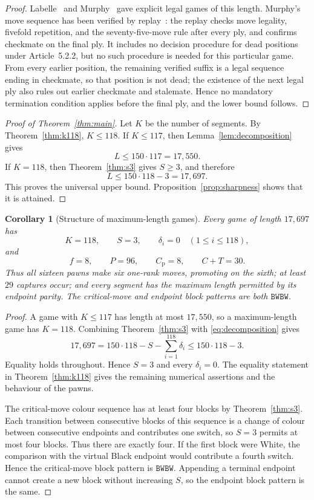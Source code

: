 \documentclass[11pt]{article}
\newtheorem{corollary}[theorem]{Corollary}
\theoremstyle{definition}
\newcommand{\B}{\mathtt{B}}
\newcommand{\W}{\mathtt{W}}
\begin{document}
\begin{proof}
Labelle~\cite{labelle2015longest} and Murphy~\cite{murphy2020longest} gave
explicit legal games of this length. Murphy's move sequence has been verified
by replay~\cite{repo}: the replay checks move legality, fivefold repetition,
and the seventy-five-move rule after every ply, and confirms checkmate on the
final ply. It includes no decision procedure for dead positions under
Article~5.2.2, but no such procedure is needed for this particular game.
From every
earlier position, the remaining verified suffix is a legal sequence ending in
checkmate, so that position is not dead; the existence of the next legal ply
also rules out earlier checkmate and stalemate. Hence no mandatory
termination condition applies before the final ply, and the lower bound
follows.
\end{proof}

\begin{proof}[Proof of Theorem~\ref{thm:main}]
Let $K$ be the number of segments. By Theorem~\ref{thm:k118}, $K\le118$. If
$K\le117$, then Lemma~\ref{lem:decomposition} gives
\[
  L\le150\cdot117=17{,}550.
\]
If $K=118$, then Theorem~\ref{thm:s3} gives $S\ge3$, and therefore
\[
  L\le150\cdot118-3=17{,}697.
\]
This proves the universal upper bound. Proposition~\ref{prop:sharpness} shows
that it is attained.
\end{proof}

\begin{corollary}[Structure of maximum-length games]\label{cor:equality}
Every game of length $17{,}697$ has
\[
  K=118,\qquad S=3,\qquad \delta_i=0\quad(1\le i\le118),
\]
and
\[
  f=8,\qquad P=96,\qquad C_{\mathrm p}=8,\qquad C+T=30.
\]
Thus all sixteen pawns make six one-rank moves, promoting on the sixth; at
least $29$ captures occur; and every segment has the maximum length permitted
by its endpoint parity.
The critical-move and endpoint block patterns are both $\B\W\B\W$.
\end{corollary}

\begin{proof}
A game with $K\le117$ has length at most $17{,}550$, so a maximum-length game
has $K=118$. Combining Theorem~\ref{thm:s3} with
\eqref{eq:decomposition} gives
\[
  17{,}697
  =150\cdot118-S-\sum_{i=1}^{118}\delta_i
  \le150\cdot118-3.
\]
Equality holds throughout. Hence $S=3$ and every $\delta_i=0$. The equality
statement in Theorem~\ref{thm:k118} gives the remaining numerical assertions
and the behaviour of the pawns.

The critical-move colour sequence has at least four blocks by
Theorem~\ref{thm:s3}. Each transition between consecutive blocks of this
sequence is a change of colour between consecutive endpoints and contributes
one switch, so $S=3$ permits at most four blocks.
Thus there are exactly four. If the first block were White, the comparison
with the virtual Black endpoint would contribute a fourth switch. Hence the
critical-move block pattern is $\B\W\B\W$. Appending a terminal endpoint
cannot create a new block without increasing $S$, so the endpoint block
pattern is the same.
\end{proof}
\end{document}
